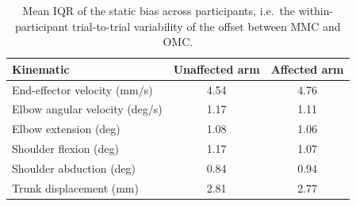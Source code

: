 \begin{table}[t]
\caption{Mean IQR of the static bias across participants, i.e.\ the
within-participant trial-to-trial variability of the offset between MMC and OMC.}
\label{tab:biasiqr}
\centering
\scriptsize
\begin{tabular}{lcc}
\toprule
Kinematic & Unaffected arm & Affected arm \\
\midrule
End-effector velocity (mm/s) & 4.54 & 4.76 \\
Elbow angular velocity (deg/s) & 1.17 & 1.11 \\
Elbow extension (deg) & 1.08 & 1.06 \\
Shoulder flexion (deg) & 1.17 & 1.07 \\
Shoulder abduction (deg) & 0.84 & 0.94 \\
Trunk displacement (mm) & 2.81 & 2.77 \\
\bottomrule
\end{tabular}
\end{table}
